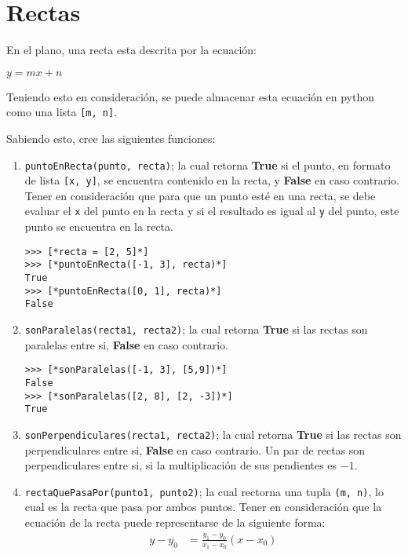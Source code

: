 \section{Rectas}

En el plano, una recta esta descrita por la ecuación:
\begin{center}
	$y = mx + n$
\end{center}

Teniendo esto en consideración, se puede almacenar esta ecuación en python como una lista \texttt{[m, n]}.

Sabiendo esto, cree las siguientes funciones:

\begin{enumerate}
\item \texttt{puntoEnRecta(punto, recta)}; la cual retorna \textbf{True} si el punto, en formato de lista \texttt{[x, y]}, se encuentra contenido en la recta, y \textbf{False} en caso contrario. Tener en consideración que para que un punto esté en una recta, se debe evaluar el \texttt{x} del punto en la recta y si el resultado es igual al \texttt{y} del punto, este punto se encuentra en la recta.

\begin{lstlisting}[style=consola]
>>> [*recta = [2, 5]*]
>>> [*puntoEnRecta([-1, 3], recta)*]
True
>>> [*puntoEnRecta([0, 1], recta)*]
False
\end{lstlisting}

\item \texttt{sonParalelas(recta1, recta2)}; la cual retorna \textbf{True} si las rectas son paralelas entre si, \textbf{False} en caso contrario.

\begin{lstlisting}[style=consola]
>>> [*sonParalelas([-1, 3], [5,9])*]
False
>>> [*sonParalelas([2, 8], [2, -3])*]
True
\end{lstlisting}

\item \texttt{sonPerpendiculares(recta1, recta2)}; la cual retorna \textbf{True} si las rectas son perpendiculares entre si, \textbf{False} en caso contrario. Un par de rectas son perpendiculares entre si, si la multiplicación de sus pendientes es $-1$.

\item \texttt{rectaQuePasaPor(punto1, punto2)}; la cual rectorna una tupla \texttt{(m, n)}, lo cual es la recta que pasa por ambos puntos. 
Tener en consideración que la ecuación de la recta puede representarse de la siguiente forma:
\begin{align*}
	y - y_{0} &= \frac{y_{1} - y_{0}}{x_{1} - x_{0}}(x - x_{0}) 
\end{align*} 


\end{enumerate}
